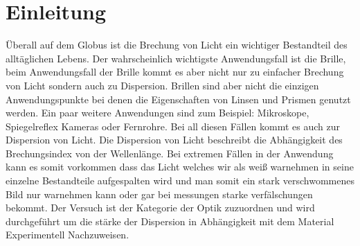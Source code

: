 \section{Einleitung}

Überall auf dem Globus ist die Brechung von Licht ein wichtiger 
Bestandteil des alltäglichen Lebens. Der wahrscheinlich wichtigste 
Anwendungsfall ist die Brille, beim Anwendungsfall der Brille kommt es 
aber nicht nur zu einfacher Brechung von Licht sondern auch zu 
Dispersion. Brillen sind aber nicht die einzigen Anwendungspunkte bei 
denen die Eigenschaften von Linsen und Prismen genutzt werden. Ein paar 
weitere Anwendungen sind zum Beispiel: Mikroskope, Spiegelreflex Kameras 
oder Fernrohre. Bei all diesen Fällen kommt es auch zur Dispersion von 
Licht. Die Dispersion von Licht beschreibt die Abhängigkeit des 
Brechungsindex von der Wellenlänge. Bei extremen Fällen in der 
Anwendung kann es somit vorkommen dass das Licht welches wir als 
weiß warnehmen in seine einzelne Bestandteile aufgespalten wird und man 
somit ein stark verschwommenes Bild nur warnehmen kann oder gar bei 
messungen starke verfälschungen bekommt. Der Versuch ist der Kategorie 
der Optik zuzuordnen und wird durchgeführt um die stärke der Dispersion 
in Abhängigkeit mit dem Material Experimentell Nachzuweisen.